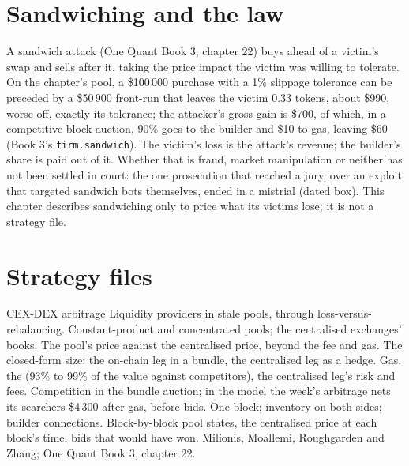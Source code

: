 \section{Sandwiching and the law}

A sandwich attack (One Quant Book 3, chapter 22) buys ahead of a victim's swap and sells after it, taking the price impact the victim was willing to
tolerate. On the chapter's pool, a \$100\,000 purchase with a 1\% slippage tolerance can be preceded by a \$50\,900 front-run that leaves the victim
0.33 tokens, about \$990, worse off, exactly its tolerance; the attacker's gross gain is \$700, of which, in a competitive block auction, 90\% goes
to the builder and \$10 to gas, leaving \$60 (Book 3's \texttt{firm.sandwich}). The victim's loss is the attack's revenue; the builder's share is
paid out of it. Whether that is fraud, market manipulation or neither has not been settled in court: the one prosecution that reached a jury, over
an exploit that targeted sandwich bots themselves, ended in a mistrial (dated box). This chapter describes sandwiching only to price what its
victims lose; it is not a strategy file.

\section{Strategy files}

\begin{strategyfile}{CEX-DEX arbitrage}\label{strat:hf:on-chain-trading:cexdex}
 Liquidity providers in stale pools, through loss-versus-rebalancing.
 Constant-product and concentrated pools; the centralised exchanges' books.
 The pool's price against the centralised price, beyond the fee and gas.
 The closed-form size; the on-chain leg in a bundle, the centralised leg as a hedge.
 Gas, the  (93\% to 99\% of the value against competitors), the centralised leg's risk and fees.
 Competition in the bundle auction; in the model the week's arbitrage nets its searchers \$4\,300 after gas, before bids.
 One block; inventory on both sides; builder connections.
 Block-by-block pool states, the centralised price at each block's time, bids that would have won.
 Milionis, Moallemi, Roughgarden and Zhang; One Quant Book 3, chapter 22.
\end{strategyfile}

